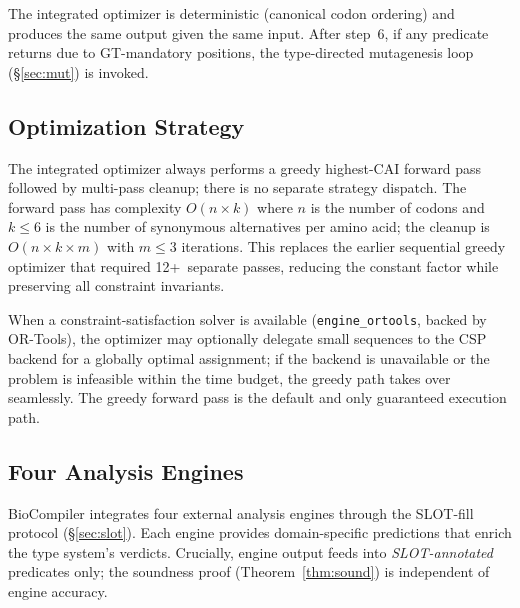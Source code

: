 The integrated optimizer is deterministic (canonical codon ordering)
and produces the same output given the same input.  After step~6, if
any predicate returns \FAIL{} due to GT-mandatory positions, the
type-directed mutagenesis loop (\S\ref{sec:mut}) is invoked.

\subsection{Optimization Strategy}\label{sec:strategies}

The integrated optimizer always performs a greedy highest-CAI forward
pass followed by multi-pass cleanup; there is no separate strategy
dispatch.  The forward pass has complexity $O(n \times k)$ where $n$
is the number of codons and $k \le 6$ is the number of synonymous
alternatives per amino acid; the cleanup is $O(n \times k \times m)$
with $m \le 3$ iterations.  This replaces the earlier sequential
greedy optimizer that required 12+~separate passes, reducing the
constant factor while preserving all constraint invariants.

When a constraint-satisfaction solver is available
(\texttt{engine\_ortools}, backed by OR-Tools), the optimizer may
optionally delegate small sequences to the CSP backend for a globally
optimal assignment; if the backend is unavailable or the problem is
infeasible within the time budget, the greedy path takes over
seamlessly.  The greedy forward pass is the default and only
guaranteed execution path.

\subsection{Four Analysis Engines}\label{sec:engines}

BioCompiler integrates four external analysis engines through the SLOT-fill
protocol (\S\ref{sec:slot}).  Each engine provides domain-specific
predictions that enrich the type system's verdicts.  Crucially, engine
output feeds into \emph{SLOT-annotated} predicates only; the soundness
proof (Theorem~\ref{thm:sound}) is independent of engine accuracy.

